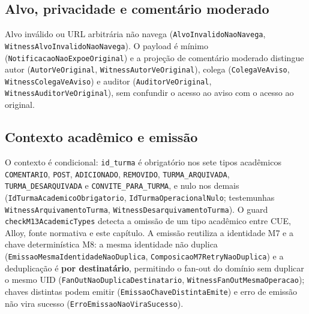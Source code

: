 \subsection*{Alvo, privacidade e comentário moderado}
Alvo inválido ou URL arbitrária não navega
(\texttt{AlvoInvalidoNaoNavega}, \texttt{WitnessAlvoInvalidoNaoNavega}). O
payload é mínimo (\texttt{NotificacaoNaoExpoeOriginal}) e a projeção de
comentário moderado distingue autor (\texttt{AutorVeOriginal},
\texttt{WitnessAutorVeOriginal}), colega (\texttt{ColegaVeAviso},
\texttt{WitnessColegaVeAviso}) e auditor (\texttt{AuditorVeOriginal},
\texttt{WitnessAuditorVeOriginal}), sem confundir o acesso ao aviso com o acesso
ao original.

\subsection*{Contexto acadêmico e emissão}
O contexto é condicional: \texttt{id\_turma} é obrigatório nos sete tipos
acadêmicos \texttt{COMENTARIO}, \texttt{POST}, \texttt{ADICIONADO},
\texttt{REMOVIDO}, \texttt{TURMA\_ARQUIVADA}, \texttt{TURMA\_DESARQUIVADA} e
\texttt{CONVITE\_PARA\_TURMA}, e
nulo nos demais (\texttt{IdTurmaAcademicoObrigatorio},
\texttt{IdTurmaOperacionalNulo}; testemunhas
\texttt{WitnessArquivamentoTurma}, \texttt{WitnessDesarquivamentoTurma}). O guard
\texttt{checkM13AcademicTypes} detecta a omissão de um tipo acadêmico entre CUE,
Alloy, fonte normativa e este capítulo. A emissão reutiliza a identidade M7 e a
chave determinística M8: a mesma identidade não duplica
(\texttt{EmissaoMesmaIdentidadeNaoDuplica},
\texttt{ComposicaoM7RetryNaoDuplica}) e a deduplicação é \textbf{por
destinatário}, permitindo o fan-out do domínio sem duplicar o mesmo UID
(\texttt{FanOutNaoDuplicaDestinatario}, \texttt{WitnessFanOutMesmaOperacao});
chaves distintas podem emitir (\texttt{EmissaoChaveDistintaEmite}) e erro de
emissão não vira sucesso (\texttt{ErroEmissaoNaoViraSucesso}).

